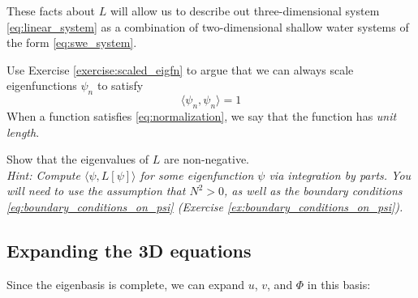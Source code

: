 \documentclass{article}
\numberwithin{equation}{section}
\begin{document}
%
These facts about $L$ will allow us to describe out three-dimensional system \eqref{eq:linear_system} as a combination of two-dimensional shallow water systems of the form \eqref{eq:swe_system}.
%
\begin{exerciseblock}
  \begin{problem}
    \label{ex:normalization}
    \usedlater
  Use Exercise \ref{exercise:scaled_eigfn} to argue that we can always scale eigenfunctions $\psi_n$ to satisfy
  \begin{equation}
    \label{eq:normalization}
    \langle\psi_n,\psi_n\rangle=1
  \end{equation}
  When a function satisfies \eqref{eq:normalization}, we say that the function has \textit{unit length}. 
\end{problem}
\begin{problem}
Show that the eigenvalues of $L$ are non-negative. 
\label{ex:nonnegative_eigenvalues}
\usedlater
%
\\\textit{Hint: Compute $\langle \psi, L[\psi]\rangle$ for some eigenfunction $\psi$ via integration by parts. You will need to use the assumption that $N^2>0$, as well as the boundary conditions \eqref{eq:boundary_conditions_on_psi} (Exercise \ref{ex:boundary_conditions_on_psi}).}
\end{problem}
\end{exerciseblock}
\subsection{Expanding the 3D equations}
Since the eigenbasis is complete, we can expand $u$, $v$, and $\Phi$ in this basis:
\end{document}
